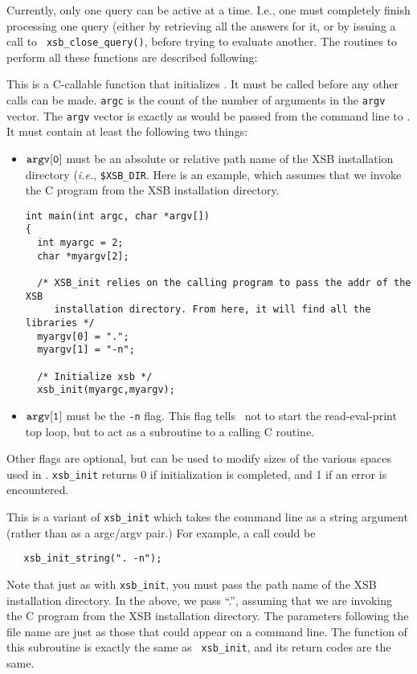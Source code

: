Currently, only one query can be active at a time.
I.e., one must completely finish processing one query (either by
retrieving all the answers for it, or by issuing a call to {\tt
xsb\_close\_query()}, before trying to evaluate another.  The
routines to perform all these functions are described following:

\begin{description}
 
This is a C-callable function that initializes \ourprolog . It must be
called before any other calls can be made.  {\tt argc} is the count of
the number of arguments in the {\tt argv} vector.  The {\tt argv}
vector is exactly as would be passed from the command line to
\ourprolog .  It must contain at least the following two things:
\begin{itemize}
\item $\tt argv[0]$ must be an absolute or relative path name of the XSB
  installation directory ({\it i.e.}, {\tt \$XSB\_DIR}.  Here is an
  example, which assumes that we invoke the C program from the XSB
  installation directory.
    \begin{verbatim}
int main(int argc, char *argv[])
{ 
  int myargc = 2;
  char *myargv[2];

  /* XSB_init relies on the calling program to pass the addr of the XSB
     installation directory. From here, it will find all the libraries */
  myargv[0] = ".";
  myargv[1] = "-n";

  /* Initialize xsb */
  xsb_init(myargc,myargv);
    \end{verbatim}
  \item $\tt argv[1]$ must be the {\tt -n} flag.  This flag tells
    \ourprolog\ not to start the read-eval-print top loop, but to act as a
    subroutine to a calling C routine.
\end{itemize}
Other flags are optional, but can be used to modify sizes of the various
spaces used in \ourprolog.  {\tt xsb\_init} returns 0 if initialization is
completed, and 1 if an error is encountered.

 
This is a variant of {\tt xsb\_init} which takes the command line as a
string argument (rather than as a argc/argv pair.)  For example, a call
could be
\begin{verbatim}
   xsb_init_string(". -n");
\end{verbatim}
Note that just as with {\tt xsb\_init}, you must pass the path name of the
XSB installation directory. In the above, we pass ``.'', assuming that we
are invoking the C program from the XSB installation directory.  The
parameters following the file name are just as those that could appear on a
command line.  The function of this subroutine is exactly the same as {\tt
  xsb\_init}, and its return codes are the same.


\end{description}
